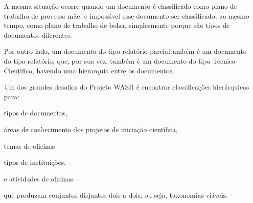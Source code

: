 \documentclass[
12pt,		%
openright,	%
twoside,  %
a4paper,			%
chapter=TITLE,		%
english,			%
french,				%
spanish,			%
brazil				%
]{USPSC-classe/USPSC}
\begin{document}
A mesma situa\c{c}\~ao ocorre quando um documento \'e classificado como \textquotedbl plano de trabalho de processo m\~ae\textquotedbl : \'e imposs\'{\i}vel esse documento ser classificado, ao mesmo tempo, como \textquotedbl plano de trabalho de bolsa\textquotedbl , simplesmente porque s\~ao tipos de documentos diferentes.














Por outro lado, um documento do tipo \textquotedbl relat\'orio parcial\textquotedbl  tamb\'em \'e um documento do tipo \textquotedbl relat\'orio\textquotedbl , que, por sua vez, tamb\'em \'e um documento do tipo \textquotedbl T\'ecnico-Cient\'{\i}fico\textquotedbl , havendo uma hierarquia entre os documentos.














Um dos grandes desafios do Projeto WASH \'e encontrar classifica\c{c}\~oes hier\'arquicas para:















\begin{alineas}
\item \textquotedbl tipos de documentos\textquotedbl ,
\item \textquotedbl \'areas de conhecimento dos projetos de inicia\c{c}\~ao cient\'{\i}fica\textquotedbl ,
\item \textquotedbl temas de oficinas\textquotedbl 
\item \textquotedbl tipos de institui\c{c}\~oes\textquotedbl ,
\item e \textquotedbl atividades de oficinas\textquotedbl 
\end{alineas}

que produzam conjuntos disjuntos dois a dois, ou seja, taxonomias vi\'aveis.
\end{document}
